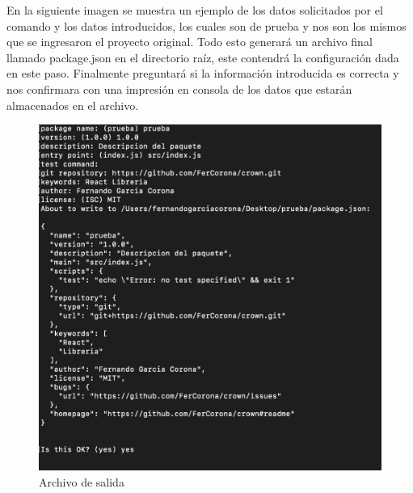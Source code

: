     En la siguiente imagen se muestra un ejemplo de los datos solicitados por el comando y los datos introducidos, los cuales son de prueba y nos son los mismos que se ingresaron el proyecto original. 
    Todo esto generará un archivo final llamado package.json en el directorio raíz, este contendrá la configuración dada en este paso.
    Finalmente preguntará si la información introducida es correcta  y nos confirmara con una impresión en consola de los datos que estarán almacenados en el archivo.
    \newline
    \newline
     \begin{figure}[H]
    \includegraphics[width=1\textwidth]{./Imagenes/image9.png}
     \caption[Archivo de salida]{Archivo de salida}
         \end{figure}
    \newline
    \newline
    
